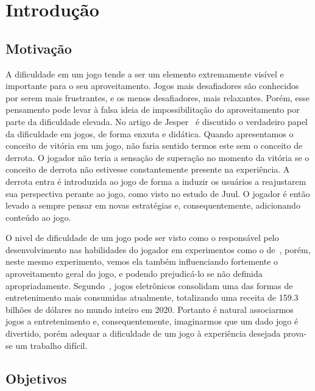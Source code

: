 
\chapter{Introdução}
\label{cap:introducao}
\section{Motivação}

A dificuldade em um jogo tende a ser um elemento extremamente visível e importante para o seu aproveitamento. Jogos mais desafiadores são conhecidos por serem mais frustrantes, e os menos desafiadores, mais relaxantes. Porém, esse pensamento pode levar à falsa ideia de impossibilitação do aproveitamento por parte da dificuldade elevada. No artigo de Jesper~\citet{FearOfFailing} é discutido o verdadeiro papel da dificuldade em jogos, de forma enxuta e didática. Quando apresentamos o conceito de vitória em um jogo, não faria sentido termos este sem o conceito de derrota. O jogador não teria a sensação de superação no momento da vitória se o conceito de derrota não estivesse constantemente presente na experiência. A derrota entra é introduzida ao jogo de forma a induzir os usuários a reajustarem sua perspectiva perante ao jogo, como visto no estudo de Juul. O jogador é então levado a sempre pensar em novas estratégias e, consequentemente, adicionando conteúdo ao jogo.

O nivel de dificuldade de um jogo pode ser visto como o responsável pelo desenvolvimento nas habilidades do jogador em experimentos como o de~\citet{ExperimentalValidation}, porém, neste mesmo experimento, vemos ela também influenciando fortemente o aproveitamento geral do jogo, e podendo prejudicá-lo se não definida apropriadamente. Segundo~\citet{VideoGameBusiness}, jogos eletrônicos consolidam uma das formas de entretenimento mais consumidas atualmente, totalizando uma receita de 159.3 bilhões de dólares no mundo inteiro em 2020. Portanto é natural associarmos jogos a entretenimento e, consequentemente, imaginarmos que um dado jogo é divertido, porém adequar a dificuldade de um jogo à experiência desejada prova-se um trabalho difícil.

\section{Objetivos}

